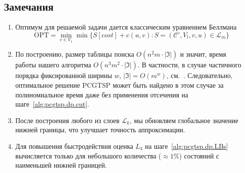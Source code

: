 \subsection*{Замечания}

\begin{enumerate}
  \item
  Оптимум для решаемой задачи дается классическим уравнением Беллмана
  \[
    \mathrm{OPT}=\min_{v\in V_1}\min\{S[cost]+c(u,v)\colon S=(\mathcal C',V_l, v, u)\in\mathcal L_m\}
  \]
  \item
  По построению,
  размер таблицы поиска
  $O(n^2m\cdot |\mathfrak I|)$
  и значит, время работы нашего алгоритма
  $O(n^3m^2\cdot |\mathfrak I|)$.
  В частности,
  в случае частичного порядка фиксированной ширины
  $w$, $|\mathfrak I|=O(m^w)$,
  см.~\cite{Steiner-1990}.
  Следовательно,
  оптимальное решение
  PCGTSP
  может быть найдено в этом случае за полиномиальное время
  даже без применения отсечения на шаге~\ref{alg:pcgtsp.dp.cut}.

  \item
  После построения любого из слоев
  $\mathcal L_k$,
  мы обновляем глобальное значение нижней границы,
  что улучшает точность аппроксимации.

  \item
  Для повышения быстродействия
  оценка $L_3$
  на шаге~\ref{alg:pcgtsp.dp.LBs}
  вычисляется
  только для небольшого количества
  ($\approx 1\%$)
  состояний с наименьшей нижней границей.
\end{enumerate}

